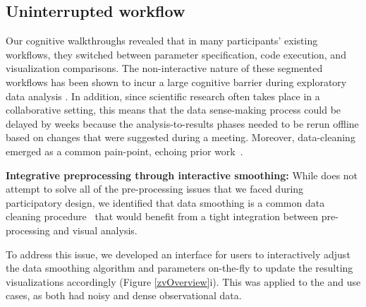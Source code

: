 \subsection{Uninterrupted workflow}
\par Our cognitive walkthroughs revealed that in many participants' existing workflows, they switched between parameter specification, code execution, and visualization comparisons. The non-interactive nature of these segmented workflows has been shown to incur a large cognitive barrier during exploratory data analysis \cite{Kery2017}. In addition, since scientific research often takes place in a collaborative setting, this means that the data sense-making process could be delayed by weeks because the analysis-to-results phases needed to be rerun offline based on changes that were suggested during a meeting. Moreover, data-cleaning emerged as a common pain-point, echoing prior work~\cite{kandel2012profiler,Guo2011}.
\par \textbf{Integrative preprocessing through interactive smoothing:} While \zv does not attempt to solve all of the pre-processing issues that we faced during participatory design, we identified that data smoothing is a common data cleaning procedure~\cite{simonoff2012smoothing} that would benefit from a tight integration between pre-processing and visual analysis.  
\par To address this issue, we developed an interface for users to interactively adjust the data smoothing algorithm and parameters on-the-fly to update the resulting visualizations accordingly (Figure \ref{zvOverview}i). This was applied to the \matsci and \astro use cases, as both had noisy and dense observational data. 
